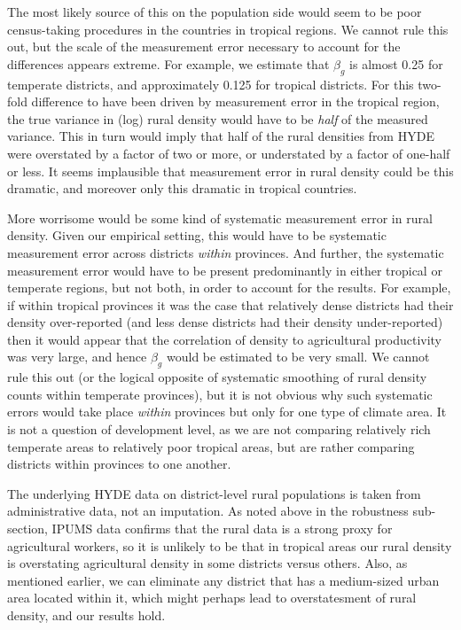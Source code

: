 The most likely source of this on the population side would seem to be poor census-taking procedures in the countries in tropical regions. We cannot rule this out, but the scale of the measurement error necessary to account for the differences appears extreme. For example, we estimate that $\beta_g$ is almost 0.25 for temperate districts, and approximately 0.125 for tropical districts. For this two-fold difference to have been driven by measurement error in the tropical region, the true variance in (log) rural density would have to be \textit{half} of the measured variance. This in turn would imply that half of the rural densities from HYDE were overstated by a factor of two or more, or understated by a factor of one-half or less. It seems implausible that measurement error in rural density could be this dramatic, and moreover only this dramatic in tropical countries.

More worrisome would be some kind of systematic measurement error in rural density. Given our empirical setting, this would have to be systematic measurement error across districts \textit{within} provinces. And further, the systematic measurement error would have to be present predominantly in either tropical or temperate regions, but not both, in order to account for the results. For example, if within tropical provinces it was the case that relatively dense districts had their density over-reported (and less dense districts had their density under-reported) then it would appear that the correlation of density to agricultural productivity was very large, and hence $\beta_g$ would be estimated to be very small. We cannot rule this out (or the logical opposite of systematic smoothing of rural density counts within temperate provinces), but it is not obvious why such systematic errors would take place \textit{within} provinces but only for one type of climate area. It is not a question of development level, as we are not comparing relatively rich temperate areas to relatively poor tropical areas, but are rather comparing districts within provinces to one another. 

The underlying HYDE data on district-level rural populations is taken from administrative data, not an imputation. As noted above in the robustness sub-section, IPUMS data confirms that the rural data is a strong proxy for agricultural workers, so it is unlikely to be that in tropical areas our rural density is overstating agricultural density in some districts versus others. Also, as mentioned earlier, we can eliminate any district that has a medium-sized urban area located within it, which might perhaps lead to overstatesment of rural density, and our results hold.

